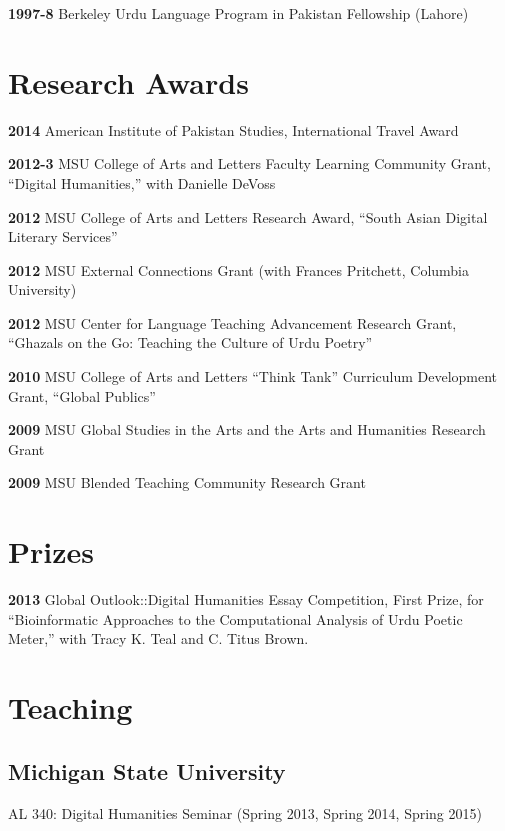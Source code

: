 \documentclass[letterpaper,12pt]{article}
\begin{document}
\textbf{1997-8}
Berkeley Urdu Language Program in Pakistan Fellowship (Lahore)


\section{Research Awards%
  \label{research-awards}%
}

\textbf{2014}
American Institute of Pakistan Studies, International Travel Award

\textbf{2012-3}
MSU College of Arts and Letters Faculty Learning Community Grant,
“Digital Humanities,” with Danielle DeVoss

\textbf{2012}
MSU College of Arts and Letters Research Award,
“South Asian Digital Literary Services”

\textbf{2012}
MSU External Connections Grant (with Frances Pritchett, Columbia University)

\textbf{2012}
MSU Center for Language Teaching Advancement Research Grant,
“Ghazals on the Go: Teaching the Culture of Urdu Poetry”

\textbf{2010}
MSU College of Arts and Letters “Think Tank” Curriculum Development Grant,
“Global Publics”

\textbf{2009} MSU Global Studies in the Arts and the Arts and Humanities Research Grant

\textbf{2009} MSU Blended Teaching Community Research Grant


\section{Prizes%
  \label{prizes}%
}

\textbf{2013}
Global Outlook::Digital Humanities Essay Competition,
First Prize,
for “Bioinformatic Approaches to the Computational Analysis of Urdu Poetic Meter,”
with Tracy K. Teal and C. Titus Brown.


\section{Teaching%
  \label{teaching}%
}


\subsection{Michigan State University%
  \label{michigan-state-university}%
}

AL 340: Digital Humanities Seminar (Spring 2013, Spring 2014, Spring 2015)
\end{document}
